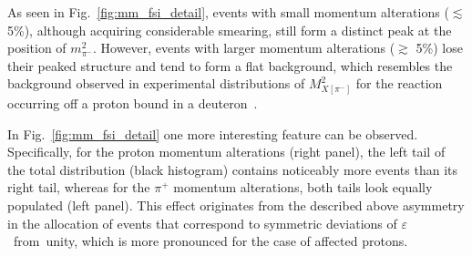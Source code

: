 As seen in Fig.~\ref{fig:mm_fsi_detail}, events with small momentum alterations ($\lesssim$ 5\%), although acquiring considerable smearing, still form a distinct peak at the position of $m_{\pi^{-}}^{2}$. However, events with larger momentum alterations ($\gtrsim$ 5\%) lose their peaked structure and tend to form a flat background, which resembles the background observed in experimental distributions of $M_{X[\pi^{-}]}^{2}$ for the reaction occurring off a proton bound in a deuteron~\cite{Skorodumina:2015rea,skorodum_an_note:2019}.

In Fig.~\ref{fig:mm_fsi_detail} one more interesting feature can be observed. Specifically, for the proton momentum alterations (right panel), the left tail of the total distribution (black histogram) contains noticeably more events than its right tail, whereas for the $\pi^{+}$ momentum alterations, both tails look equally populated (left panel). This effect originates from the described above asymmetry in the allocation of events that correspond to symmetric deviations of $\varepsilon$~from~unity, which is more pronounced for the case of affected protons.





